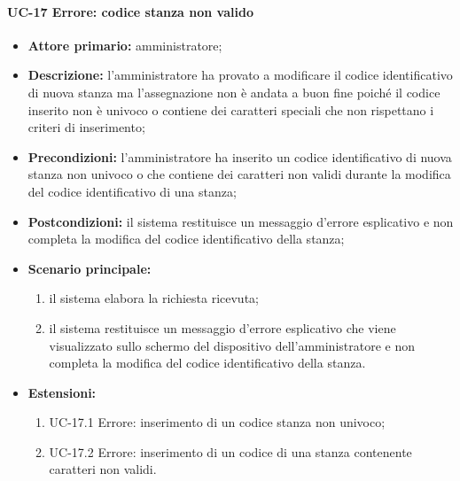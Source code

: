 \paragraph{UC-17 Errore: codice stanza non valido}
\begin{itemize}
	\item \textbf{Attore primario:} amministratore;
	\item \textbf{Descrizione:} l'amministratore ha provato a modificare il codice identificativo di nuova stanza ma l'assegnazione non è andata a buon fine poiché il codice inserito non è univoco o contiene dei caratteri speciali che non rispettano i criteri di inserimento;
	\item \textbf{Precondizioni:} l'amministratore ha inserito un codice identificativo di nuova stanza non univoco o che contiene dei caratteri non validi durante la modifica del codice identificativo di una stanza;
	\item \textbf{Postcondizioni:} il sistema restituisce un messaggio d'errore esplicativo e non completa la modifica del codice identificativo della stanza;
	\item \textbf{Scenario principale:}
	      \begin{enumerate}
		      \item il sistema elabora la richiesta ricevuta;
		      \item il sistema restituisce un messaggio d'errore esplicativo che viene visualizzato sullo schermo del dispositivo dell'amministratore e non completa la modifica del codice identificativo della stanza.
	      \end{enumerate}
	 \item \textbf{Estensioni:}
	 	\begin{enumerate}
		       \item UC-17.1 Errore: inserimento di un codice stanza non univoco;
		       \item UC-17.2 Errore: inserimento di un codice di una stanza contenente caratteri non validi.
	        \end{enumerate}
\end{itemize}

